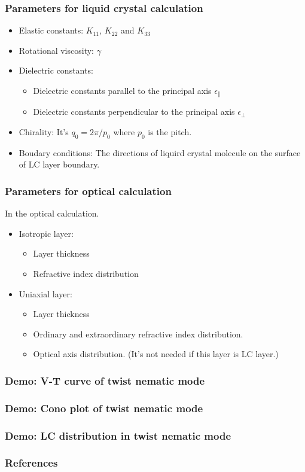 \documentclass{beamer}
\begin{document}
\begin{frame}
\frametitle{Parameters for liquid crystal calculation}
\begin{itemize}
\item Elastic constants: $K_{11}$, $K_{22}$ and $K_{33}$
\item Rotational viscosity: $\gamma$
\item Dielectric constants:
	\begin{itemize}
	\item Dielectric constants parallel to the principal axis $\epsilon_{\parallel}$
	\item Dielectric constants perpendicular to the principal axis $\epsilon_{\perp}$
	\end{itemize}
\item Chirality: It's $q_0=2\pi/p_0$ where $p_0$ is the pitch.
\item Boudary conditions: The directions of liquird crystal molecule on the surface of LC layer boundary.
\end{itemize}
\end{frame}
\begin{frame}
\frametitle{Parameters for optical calculation}
In the optical calculation.
\begin{itemize}
\item Isotropic layer:
	\begin{itemize}
	\item Layer thickness
	\item Refractive index distribution 
	\end{itemize}
\item Uniaxial layer:
	\begin{itemize}
	\item Layer thickness
	\item Ordinary and extraordinary refractive index distribution.
	\item Optical axis distribution. (It's not needed if this layer is LC layer.)
	\end{itemize}
\end{itemize}
\end{frame}
\begin{frame}
\frametitle{Demo: V-T curve of twist nematic mode}
\end{frame}
\begin{frame}
\frametitle{Demo: Cono plot of twist nematic mode}
\end{frame}
\begin{frame}
\frametitle{Demo: LC distribution in twist nematic mode}
\end{frame}
\begin{frame}
\frametitle{References}
\begin{thebibliography}{0}
\end{thebibliography}
\end{frame}
\end{document}
